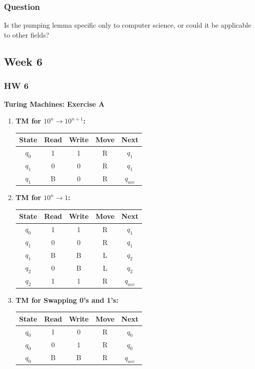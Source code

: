 \documentclass{article}
\theoremstyle{theorem}
\theoremstyle{definition}
\theoremstyle{remark}
\begin{document}
\subsubsection{Question}
Is the pumping lemma specific only to computer science, or could it be applicable to other fields?

\subsection{Week 6}

\subsubsection{HW 6}

\textbf{Turing Machines: Exercise A}

\begin{enumerate}
    \item \textbf{TM for $10^n \to 10^{n+1}$:} 
    \begin{center}
    \begin{tabular}{ccccc}
    \toprule
    State & Read & Write & Move & Next \\ \midrule
    $q_0$ & 1 & 1 & R & $q_1$ \\
    $q_1$ & 0 & 0 & R & $q_1$ \\
    $q_1$ & B & 0 & R & $q_{acc}$ \\ \bottomrule
    \end{tabular}
    \end{center}

    \item \textbf{TM for $10^n \to 1$:} 
    \begin{center}
    \begin{tabular}{ccccc}
    \toprule
    State & Read & Write & Move & Next \\ \midrule
    $q_0$ & 1 & 1 & R & $q_1$ \\
    $q_1$ & 0 & 0 & R & $q_1$ \\
    $q_1$ & B & B & L & $q_2$ \\
    $q_2$ & 0 & B & L & $q_2$ \\
    $q_2$ & 1 & 1 & R & $q_{acc}$ \\ \bottomrule
    \end{tabular}
    \end{center}

    \item \textbf{TM for Swapping 0's and 1's:}
    \begin{center}
    \begin{tabular}{ccccc}
    \toprule
    State & Read & Write & Move & Next \\ \midrule
    $q_0$ & 1 & 0 & R & $q_0$ \\
    $q_0$ & 0 & 1 & R & $q_0$ \\
    $q_0$ & B & B & R & $q_{acc}$ \\ \bottomrule
    \end{tabular}
    \end{center}
\end{enumerate}
\end{document}
